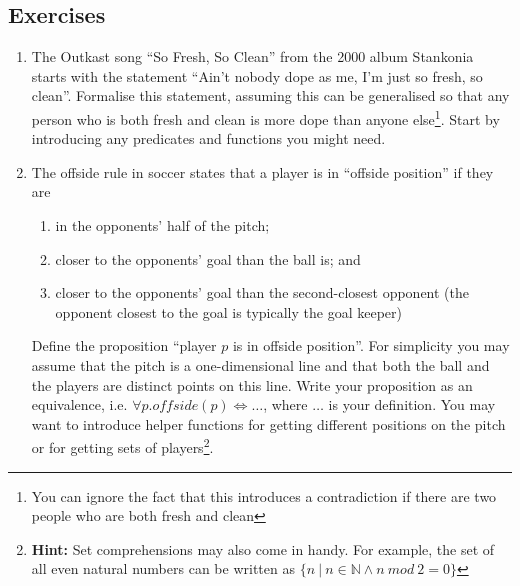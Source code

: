 \documentclass{tufte-handout}
\newcounter{example}
\newcounter{theExerciseCounter}
\begin{document}
\subsection{Exercises}

\begin{enumerate}
\item\label{ex:freshclean} The Outkast song ``So Fresh, So Clean''
  from the 2000 album Stankonia starts with the statement ``Ain't
  nobody dope as me, I'm just so fresh, so clean''. Formalise this
  statement, assuming this can be generalised so that any person
  who is both fresh and clean is more dope than anyone
  else\footnote{You can ignore the fact that this introduces a
    contradiction if there are two people who are both fresh and
    clean}. Start by introducing any predicates and functions you
  might need.

\item\label{ex:offside} The offside rule in soccer states that a player is in
  ``offside position'' if they are
  \begin{enumerate}
  \item in the opponents' half of the pitch;
  \item closer to the opponents' goal than the ball is; and
  \item closer to the opponents' goal than the second-closest
    opponent (the opponent closest to the goal is typically the
    goal keeper)
  \end{enumerate}

  Define the proposition ``player $p$ is in offside position''.
  For simplicity you may assume that the pitch is a
  one-dimensional line and that both the ball and the players are
  distinct points on this line. Write your proposition as an
  equivalence, i.e. $\forall p. \mathit{offside}(p) \iff \dots$,
  where $\dots$ is your definition. You may want to introduce
  helper functions for getting different positions on the pitch or
  for getting sets of players\footnote{\textbf{Hint:} Set
    comprehensions may also come in handy. For example, the set of
    all even natural numbers can be written as
    $\{n ~|~ n \in \mathbb{N} \land n~mod~2 = 0\}$}.
\setcounter{theExerciseCounter}{\value{enumi}}
\end{enumerate}
\end{document}
